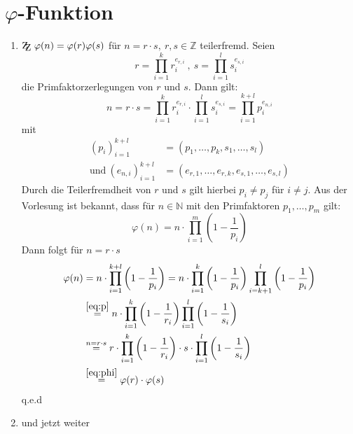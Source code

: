 \documentclass[DIN, pagenumber=false, fontsize=11pt, parskip=half]{scrartcl}
\newcommand{\Z}[0]{\mathbb{Z}}
\newcommand{\N}[0]{\mathbb{N}}
\newcommand{\ZZ}{\mathrm{Z\kern-.3em\raise-0.5ex\hbox{Z}}}
\begin{document}
    \section{$\varphi$-Funktion}
    \begin{enumerate}[label=\alph*)]
        \item $\ZZ \ \varphi(n) = \varphi(r) \varphi(s)$ für $n = r \cdot s, \ r, s \in \Z$ teilerfremd.
        Seien
        \begin{equation*}
            r = \prod_{i=1}^k{r_i^{e_{r,i}}} \ , \ s = \prod_{i=1}^l{s_i^{e_{s,i}}}
        \end{equation*}
        die Primfaktorzerlegungen von $r$ und $s$. Dann gilt:
        \begin{equation*}
            n = r \cdot s = \prod_{i=1}^k{r_i^{e_{r,i}}} \cdot \prod_{i=1}^l{s_i^{e_{s,i}}} = \prod_{i=1}^{k+l}{p_i^{e_{n, i}}}
        \end{equation*}
        mit 
        \begin{align}
            (p_i)_{i=1}^{k+l} &= (p_1, \dots, p_k, s_1, \dots, s_l) \label{eq:p}\\
            \text{und} \ (e_{n,i})_{i=1}^{k+l} &= (e_{r, 1}, \dots, e_{r, k}, e_{s, 1}, \dots, e_{s, l})
        \end{align}
        Durch die Teilerfremdheit von $r$ und $s$ gilt hierbei $p_i \neq p_j$ für $i \neq j$.
        Aus der Vorlesung ist bekannt, dass für $n \in \N$ mit den Primfaktoren $p_1, \dots, p_m$ gilt:
        \begin{equation}
            \varphi(n) = n \cdot \prod_{i=1}^m{\left(1 - \frac{1}{p_i}\right)}
            \label{eq:phi}
        \end{equation}
        Dann folgt für $n = r \cdot s$
        \begin{align*}
            \varphi(n) &= n \cdot \prod_{i = 1}^{k+l}{\left(1 - \frac{1}{p_i}\right)} =
            n \cdot \prod_{i=1}^k{\left(1 - \frac{1}{p_i}\right)} \prod_{i=k+1}^l{\left(1 - \frac{1}{p_i}\right)} \\
            &\stackrel{\ref{eq:p}}{=} n \cdot \prod_{i=1}^k{\left(1 - \frac{1}{r_i}\right)} \prod_{i=1}^l{\left(1 - \frac{1}{s_i}\right)} \\
            & \stackrel{n=r \cdot s}{=} r \cdot \prod_{i=1}^k{\left(1 - \frac{1}{r_i}\right)} \cdot s \cdot \prod_{i=1}^l{\left(1 - \frac{1}{s_i}\right)} \\
            &\stackrel{\ref{eq:phi}}{=} \varphi(r) \cdot \varphi(s)
        \end{align*}
        q.e.d

        \item und jetzt weiter
    \end{enumerate}
\end{document}
